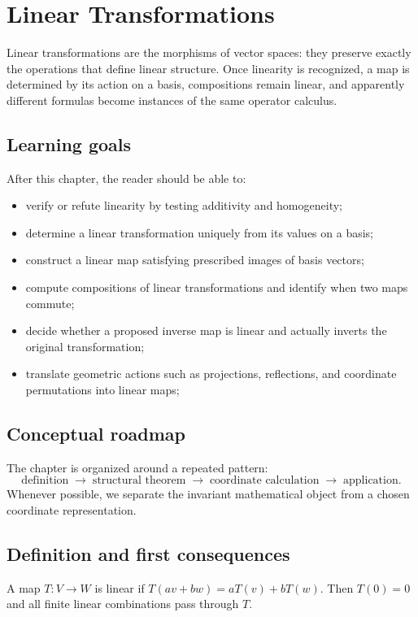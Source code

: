 \chapter{Linear Transformations}
\label{ch:i05-linear-transformations}

Linear transformations are the morphisms of vector spaces: they preserve exactly the operations that define linear structure. Once linearity is recognized, a map is determined by its action on a basis, compositions remain linear, and apparently different formulas become instances of the same operator calculus.

\section*{Learning goals}
After this chapter, the reader should be able to:
\begin{itemize}
\item verify or refute linearity by testing additivity and homogeneity;
\item determine a linear transformation uniquely from its values on a basis;
\item construct a linear map satisfying prescribed images of basis vectors;
\item compute compositions of linear transformations and identify when two maps commute;
\item decide whether a proposed inverse map is linear and actually inverts the original transformation;
\item translate geometric actions such as projections, reflections, and coordinate permutations into linear maps;
\end{itemize}
\section*{Conceptual roadmap}
The chapter is organized around a repeated pattern:
\[
\boxed{\text{definition}\;\longrightarrow\;\text{structural theorem}\;\longrightarrow\;\text{coordinate calculation}\;\longrightarrow\;\text{application}.}
\]
Whenever possible, we separate the invariant mathematical object from a chosen coordinate representation.

\section{Definition and first consequences}
A map $T:V\to W$ is linear if $T(av+bw)=aT(v)+bT(w)$. Then $T(0)=0$ and all finite linear combinations pass through $T$.


